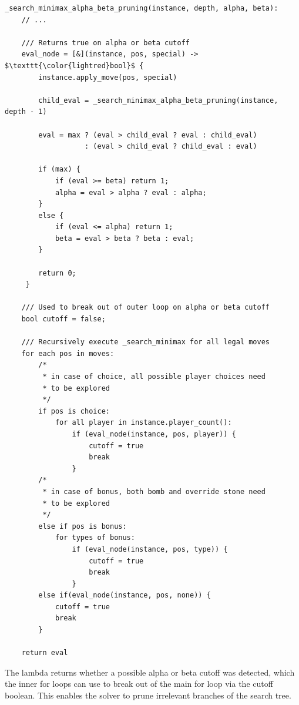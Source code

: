 \begin{lstlisting}[mathescape]
_search_minimax_alpha_beta_pruning(instance, depth, alpha, beta):
    // ...
    
    /// Returns true on alpha or beta cutoff
    eval_node = [&](instance, pos, special) -> $\texttt{\color{lightred}bool}$ {
        instance.apply_move(pos, special)

        child_eval = _search_minimax_alpha_beta_pruning(instance, depth - 1)

        eval = max ? (eval > child_eval ? eval : child_eval)
                   : (eval > child_eval ? child_eval : eval)

        if (max) {
            if (eval >= beta) return 1;
            alpha = eval > alpha ? eval : alpha;
        }
        else {
            if (eval <= alpha) return 1;
            beta = eval > beta ? beta : eval;
        }

        return 0;
     }

    /// Used to break out of outer loop on alpha or beta cutoff
    bool cutoff = false;

    /// Recursively execute _search_minimax for all legal moves
    for each pos in moves:
        /*
         * in case of choice, all possible player choices need
         * to be explored
         */
        if pos is choice:
            for all player in instance.player_count():
                if (eval_node(instance, pos, player)) {
                    cutoff = true
                    break
                }
        /*
         * in case of bonus, both bomb and override stone need
         * to be explored
         */
        else if pos is bonus:
            for types of bonus:
                if (eval_node(instance, pos, type)) {
                    cutoff = true
                    break
                }
        else if(eval_node(instance, pos, none)) {
            cutoff = true
            break
        }

    return eval
\end{lstlisting}
\vspace{10px}
The lambda returns whether a possible alpha or beta cutoff was detected, which the inner for loops can use to break out of the main for loop via the cutoff boolean. This enables the solver to prune irrelevant branches of the search tree.
